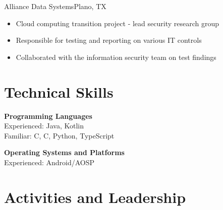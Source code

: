 \documentclass[11pt,a4paper,sans]{moderncv}
\newcommand{\Rplus}{\protect\hspace{-.1em}\protect\raisebox{.35ex}{\smaller{\smaller\textbf{+}}}}
\newcommand{\Cpp}{\mbox{C\Rplus\Rplus}\xspace}
\newcommand{\spacing}{4pt}
\begin{document}
\vspace{\spacing}

  {Alliance Data Systems}{Plano, TX}{}{\vspace{3pt}
    \begin{itemize}
      \item Cloud computing transition project - lead security research group
      \item Responsible for testing and reporting on various IT controls
      \item Collaborated with the information security team on test findings
    \end{itemize}
    }

\section{Technical Skills}

\vspace{-.75em}

\begin{multicols}{2}
\noindent

\textbf{Programming Languages} \\
  Experienced: Java, Kotlin \\
  Familiar: \Cpp, C, Python, TypeScript

\textbf{Operating Systems and Platforms} \\
  Experienced: Android/AOSP

\end{multicols}

\vspace{-1.5em}

\section{Activities and Leadership}

\vspace{\spacing}

\addvspace{-1em}




%
%
%
%
\end{document}
